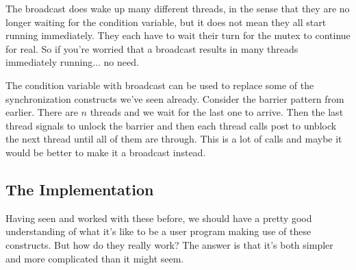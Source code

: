 The broadcast does wake up many different threads, in the sense that they are no longer waiting for the condition variable, but it does not mean they all start running immediately. They each have to wait their turn for the mutex to continue for real. So if you're worried that a broadcast results in many threads immediately running... no need.

The condition variable with broadcast can be used to replace some of the synchronization constructs we've seen already. Consider the barrier pattern from earlier. There are $n$ threads and we wait for the last one to arrive. Then the last thread signals to unlock the barrier and then each thread calls post to unblock the next thread until all of them are through. This is a lot of calls and maybe it would be better to make it a broadcast instead. 


\subsection*{The Implementation}
Having seen and worked with these before, we should have a pretty good understanding of what it's like to be a user program making use of these constructs. But how do they really work? The answer is that it's both simpler and more complicated than it might seem. 




